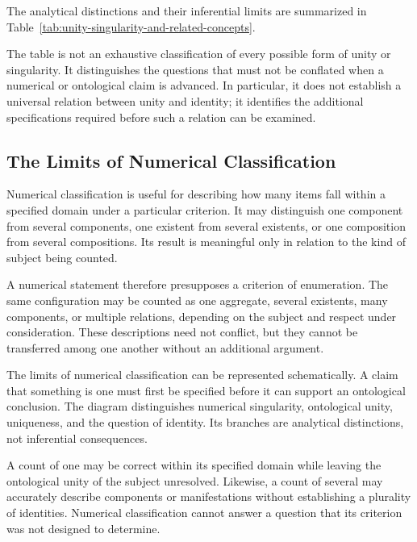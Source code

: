 The analytical distinctions and their
inferential limits are summarized in
Table~\ref{tab:unity-singularity-and-related-concepts}.



The table is not an exhaustive classification
of every possible form of unity or singularity.
It distinguishes the questions that must
not be conflated when a numerical or
ontological claim is advanced. In particular,
it does not establish a universal relation
between unity and identity; it identifies
the additional specifications required
before such a relation can be examined.

\subsection{The Limits of Numerical Classification}

Numerical classification is useful for
describing how many items fall within
a specified domain under a particular
criterion. It may distinguish one component
from several components, one existent
from several existents, or one composition
from several compositions. Its result
is meaningful only in relation to the
kind of subject being counted.

A numerical statement therefore presupposes
a criterion of enumeration. The same
configuration may be counted as one
aggregate, several existents, many
components, or multiple relations,
depending on the subject and respect
under consideration. These descriptions
need not conflict, but they cannot be
transferred among one another without
an additional argument.

The limits of numerical classification
can be represented schematically.
A claim that something is one must first
be specified before it can support an
ontological conclusion. The diagram
distinguishes numerical singularity,
ontological unity, uniqueness, and
the question of identity. Its branches
are analytical distinctions, not
inferential consequences.



A count of one may be correct within
its specified domain while leaving the
ontological unity of the subject unresolved.
Likewise, a count of several may accurately
describe components or manifestations
without establishing a plurality of
identities. Numerical classification
cannot answer a question that its
criterion was not designed to determine.

